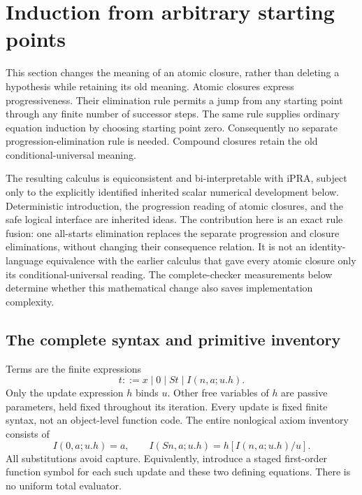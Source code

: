 \section{Induction from arbitrary starting points}\label{sec:choice-introduction}
\label{sec:all-starts}

This section changes the meaning of an atomic closure, rather than
deleting a hypothesis while retaining its old meaning. Atomic closures
express progressiveness. Their elimination rule permits a jump from any
starting point through any finite number of successor steps. The same
rule supplies ordinary equation induction by choosing starting point
zero. Consequently no separate progression-elimination rule is needed.
Compound closures retain the old conditional-universal meaning.

The resulting calculus is equiconsistent and bi-interpretable with iPRA,
subject only to the explicitly identified inherited scalar numerical
development below. Deterministic introduction, the progression reading
of atomic closures, and the safe logical interface are inherited ideas.
The contribution here is an exact rule fusion: one all-starts
elimination replaces the separate progression and closure eliminations,
without changing their consequence relation. It is not an
identity-language equivalence with the earlier calculus that gave
every atomic closure only its conditional-universal reading. The complete-checker measurements below determine whether this
mathematical change also saves implementation complexity.

\subsection{The complete syntax and primitive inventory}

Terms are the finite expressions
\[
 t::=x\mid0\mid St\mid I(n,a;u.h).
\]
Only the update expression $h$ binds $u$. Other free variables of $h$
are passive parameters, held fixed throughout its iteration. Every
update is fixed finite syntax, not an object-level function code. The
entire nonlogical axiom inventory consists of
\[
 I(0,a;u.h)=a,\qquad
 I(Sn,a;u.h)=h[I(n,a;u.h)/u].
 \tag{AS-I}
\]
All substitutions avoid capture. Equivalently, introduce a staged
first-order function symbol for each such update and these two defining
equations. There is no uniform total evaluator.


